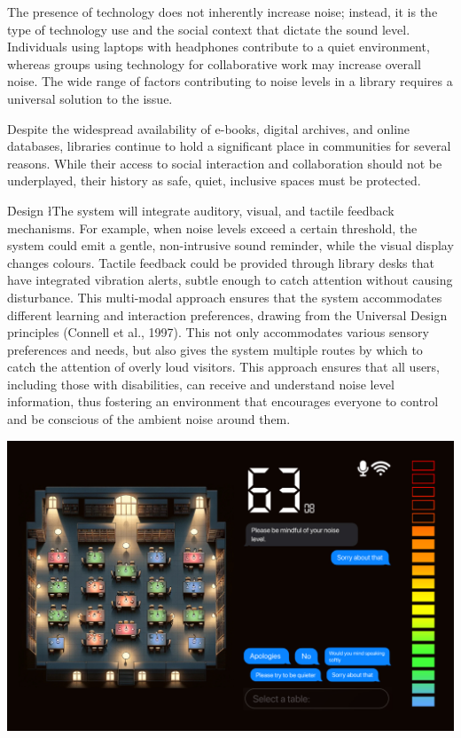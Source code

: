 \documentclass{novel}
\begin{document}
The presence of technology does not inherently increase noise; instead, it is the type of technology use and the social context that dictate the sound level. Individuals using laptops with headphones contribute to a quiet environment, whereas groups using technology for collaborative work may increase overall noise. The wide range of factors contributing to noise levels in a library requires a universal solution to the issue.

Despite the widespread availability of e-books, digital archives, and online databases, libraries continue to hold a significant place in communities for several reasons. While their access to social interaction and collaboration should not be underplayed, their history as safe, quiet, inclusive spaces must be protected.

\h{Design}
\l{T}he system will integrate auditory, visual, and tactile feedback mechanisms. For example, when noise levels exceed a certain threshold, the system could emit a gentle, non-intrusive sound reminder, while the visual display changes colours. Tactile feedback could be provided through library desks that have integrated vibration alerts, subtle enough to catch attention without causing disturbance. This multi-modal approach ensures that the system accommodates different learning and interaction preferences, drawing from the Universal Design principles (Connell et al., 1997). This not only accommodates various sensory preferences and needs, but also gives the system multiple routes by which to catch the attention of overly loud visitors. This approach ensures that all users, including those with disabilities, can receive and understand noise level information, thus fostering an environment that encourages everyone to control and be conscious of the ambient noise around them.

\noindent
\includegraphics[width=\textwidth]{resources/design.jpg}
\end{document}
